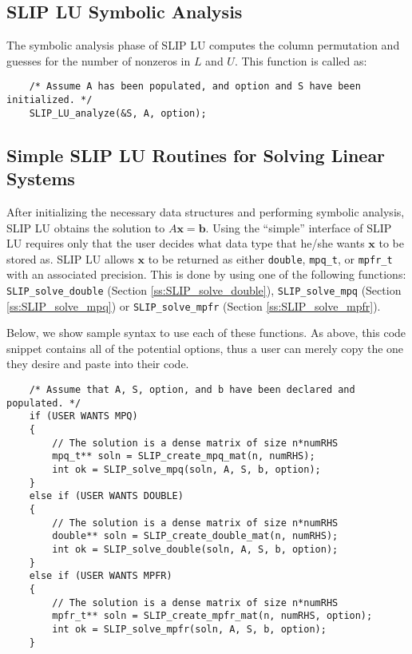 \documentclass[12pt]{article}
\theoremstyle{definition}
\begin{document}
\cprotect\subsection{SLIP LU Symbolic Analysis}
\label{s:Using:symb}

The symbolic analysis phase of SLIP LU computes the column permutation and
guesses for the number of nonzeros in $L$ and $U$. This function is called as:

{\small
    \begin{verbatim}
    /* Assume A has been populated, and option and S have been initialized. */
    SLIP_LU_analyze(&S, A, option); \end{verbatim} }

\cprotect\subsection{Simple SLIP LU Routines for Solving Linear Systems}
\label{s:Using:simple}

After initializing the necessary data structures and performing symbolic
analysis, SLIP LU obtains the solution to $A \mathbf{x} = \mathbf{b}$. Using
the ``simple'' interface of SLIP LU requires only that the user decides what data
type that he/she wants $\mathbf{x}$ to be stored as. SLIP LU allows
$\mathbf{x}$ to be returned as either \verb|double|, \verb|mpq_t|, or
\verb|mpfr_t| with an associated precision. This is done by using one of the
following functions: \verb|SLIP_solve_double| (Section
\ref{ss:SLIP_solve_double}), \verb|SLIP_solve_mpq| (Section
\ref{ss:SLIP_solve_mpq}) or \verb|SLIP_solve_mpfr| (Section
\ref{ss:SLIP_solve_mpfr}).

Below, we show sample syntax to use each of these functions. As above, this
code snippet contains all of the potential options, thus a user can merely copy
the one they desire and paste into their code.

{\small
\begin{verbatim}
    /* Assume that A, S, option, and b have been declared and populated. */
    if (USER WANTS MPQ)
    {
        // The solution is a dense matrix of size n*numRHS
        mpq_t** soln = SLIP_create_mpq_mat(n, numRHS);
        int ok = SLIP_solve_mpq(soln, A, S, b, option);
    }
    else if (USER WANTS DOUBLE)
    {
        // The solution is a dense matrix of size n*numRHS
        double** soln = SLIP_create_double_mat(n, numRHS);
        int ok = SLIP_solve_double(soln, A, S, b, option);
    }
    else if (USER WANTS MPFR)
    {
        // The solution is a dense matrix of size n*numRHS
        mpfr_t** soln = SLIP_create_mpfr_mat(n, numRHS, option);
        int ok = SLIP_solve_mpfr(soln, A, S, b, option);
    } \end{verbatim}}
\end{document}
